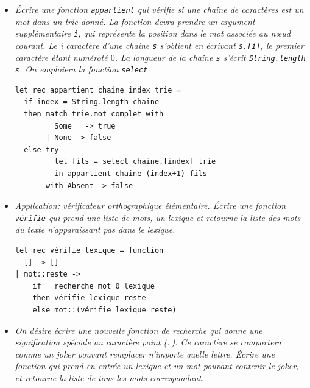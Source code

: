 \documentclass[11pt, a4paper]{article}
\begin{document}
\begin{itemize}
       \medskip

       \begin{verbatim}
exception Absent

let select lettre trie =
  try
    List.assoc lettre trie.suite
  with Not_found -> raise Absent
       \end{verbatim}

       \smallskip

  \item[\textbf{A.4}] \emph{Écrire une fonction \texttt{appartient}
  qui vérifie si une chaîne de caractères est un mot dans un {\em
    trie} donné. La fonction devra prendre un argument supplémentaire
  {\tt i}, qui représente la position dans le mot associée au nœud
  courant.  Le i\ieme{} caractère d'une chaîne {\tt s} s'obtient en
  écrivant {\tt s.[i]}, le premier caractère étant numéroté $0$. La
  longueur de la chaîne {\tt s} s'écrit {\tt String.length s}. On
  emploiera la fonction \texttt{select}.}

       \smallskip

       \begin{verbatim}
let rec appartient chaine index trie =
  if index = String.length chaine
  then match trie.mot_complet with
         Some _ -> true
       | None -> false
  else try
         let fils = select chaine.[index] trie
         in appartient chaine (index+1) fils
       with Absent -> false
       \end{verbatim}

       \smallskip

  \item[\textbf{A.5}] \emph{Application: vérificateur orthographique
       élémentaire. Écrire une fonction \texttt{vérifie} qui prend une
       liste de mots, un lexique et retourne la liste des mots du
       texte n'apparaissant pas dans le lexique.}

       \smallskip

       \begin{verbatim}
let rec vérifie lexique = function
  [] -> []
| mot::reste ->
    if   recherche mot 0 lexique
    then vérifie lexique reste
    else mot::(vérifie lexique reste)
       \end{verbatim}

      \smallskip

  \item[\textbf{A.6}] \emph{On désire écrire une nouvelle fonction de
       recherche qui donne une signification spéciale au caractère
       point (\texttt{.}). Ce caractère se comportera comme un
       \emph{joker} pouvant remplacer n'importe quelle lettre. Écrire
       une fonction qui prend en entrée un lexique et un mot pouvant
       contenir le \emph{joker}, et retourne la liste de tous les mots
       correspondant.}


\end{itemize}
\end{document}
